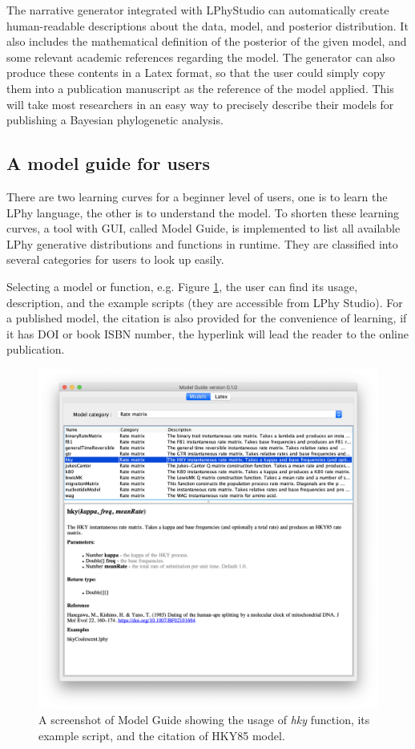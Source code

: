 \documentclass[10pt,letterpaper,table]{article}
\begin{document}
{The narrative generator integrated with LPhyStudio can automatically create human-readable descriptions about the data, model, and posterior distribution. 
It also includes the mathematical definition of the posterior of the given model, and some relevant academic references regarding the model. 
The generator can also produce these contents in a Latex format, so that the user could simply copy them into a publication manuscript as the reference of the model applied. 
This will take most researchers in an easy way to precisely describe their models for publishing a Bayesian phylogenetic analysis. 


\subsection{A model guide for users}

There are two learning curves for a beginner level of users, one is to learn the LPhy language, the other is to understand the model. To shorten these learning curves, a tool with GUI, called Model Guide, is implemented to list all available LPhy generative distributions and functions in runtime. 
They are classified into several categories for users to look up easily.

Selecting a model or function, e.g. Figure \ref{fig:modelguide}, the user can find its usage, description, and the example scripts (they are accessible from LPhy Studio). For a published model, the citation is also provided for the convenience of learning, if it has DOI or book ISBN number, the hyperlink will lead the reader to the online publication.   

\begin{figure}
  \includegraphics[width=\textwidth]{figs/modelguide.png}
  \caption{A screenshot of Model Guide showing the usage of \emph{hky} function, its example script, and the citation of HKY85 model.} 
  \label{fig:modelguide}
\end{figure}


}
\end{document}
